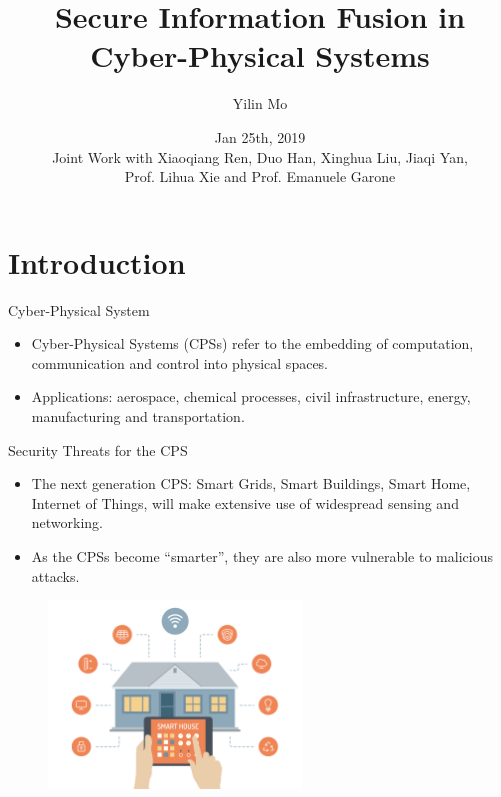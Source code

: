 \documentclass[10pt]{beamer}
\title[Secure Info Fusion]{Secure Information Fusion in Cyber-Physical Systems}
\author[Yilin Mo]{Yilin Mo}
\institute[Tsinghua]{
  Department of Automation\\ Tsinghua University\\
}
\date[Jan 25, 2019]{Jan 25th, 2019 \\ 
  \small Joint Work with Xiaoqiang Ren, Duo Han, Xinghua Liu, Jiaqi Yan,\\
  Prof. Lihua Xie and Prof. Emanuele Garone}
\begin{document}
\maketitle 

\section{Introduction}

\begin{frame}{Cyber-Physical System}
  \begin{itemize}
  \item Cyber-Physical Systems (CPSs) refer to the embedding of computation, communication and control into physical spaces.
    \begin{center}
    \end{center}
  \item Applications: aerospace, chemical processes, civil infrastructure, energy, manufacturing and transportation. 
  \end{itemize}
\end{frame}

\begin{frame}{Security Threats for the CPS}
  \begin{itemize}
  \item The next generation CPS: Smart Grids, Smart Buildings, Smart Home, Internet of Things, will make extensive use of widespread sensing and networking.
  \item As the CPSs become ``smarter'', they are also more vulnerable to malicious attacks.
  \end{itemize}
  \begin{figure}[ht]
    \centering
    \includegraphics[width=0.6\textwidth]{SmartHome.jpg}
  \end{figure}
\end{frame}
\end{document}
